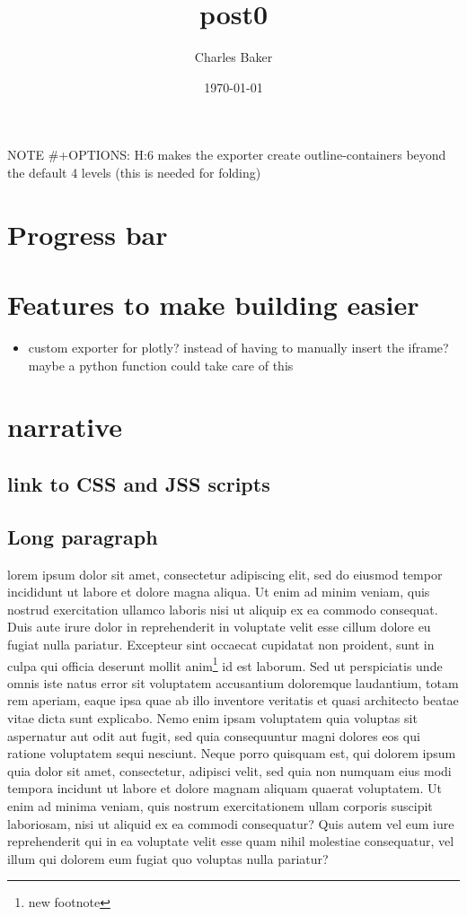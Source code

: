 \documentclass[11pt]{article}
\author{Charles Baker}
\date{\today}
\title{post0}
\begin{document}
\maketitle
\tableofcontents

NOTE \#+OPTIONS: H:6 makes the exporter create outline-containers beyond the default 4 levels (this is needed for folding)
\section{Progress bar}
\label{sec:org54bfe29}
\section{Features to make building easier}
\label{sec:org3a05e6d}
\begin{itemize}
\item custom exporter for plotly? instead of having to manually insert the iframe?  maybe a python function could take care of this
\end{itemize}
\section{narrative}
\label{sec:orge9eeec2}

\subsection{link to CSS and JSS scripts}
\label{sec:orgf24bd0c}
\subsection{Long paragraph}
\label{sec:orga2ac2ca}
lorem ipsum dolor sit amet, consectetur adipiscing elit, sed do eiusmod tempor incididunt ut labore et dolore magna aliqua. Ut enim ad minim veniam, quis nostrud exercitation ullamco laboris nisi ut aliquip ex ea commodo consequat. Duis aute irure dolor in reprehenderit in voluptate velit esse cillum dolore eu fugiat nulla pariatur. Excepteur sint occaecat cupidatat non proident, sunt in culpa qui officia deserunt mollit anim\footnote{new footnote} id est laborum.  Sed ut perspiciatis unde omnis iste natus error sit voluptatem accusantium doloremque laudantium, totam rem aperiam, eaque ipsa quae ab illo inventore veritatis et quasi architecto beatae vitae dicta sunt explicabo. Nemo enim ipsam voluptatem quia voluptas sit aspernatur aut odit aut fugit, sed quia consequuntur magni dolores eos qui ratione voluptatem sequi nesciunt. Neque porro quisquam est, qui dolorem ipsum quia dolor sit amet, consectetur, adipisci velit, sed quia non numquam eius modi tempora incidunt ut labore et dolore magnam aliquam quaerat voluptatem. Ut enim ad minima veniam, quis nostrum exercitationem ullam corporis suscipit laboriosam, nisi ut aliquid ex ea commodi consequatur? Quis autem vel eum iure reprehenderit qui in ea voluptate velit esse quam nihil molestiae consequatur, vel illum qui dolorem eum fugiat quo voluptas nulla pariatur?  
\end{document}
